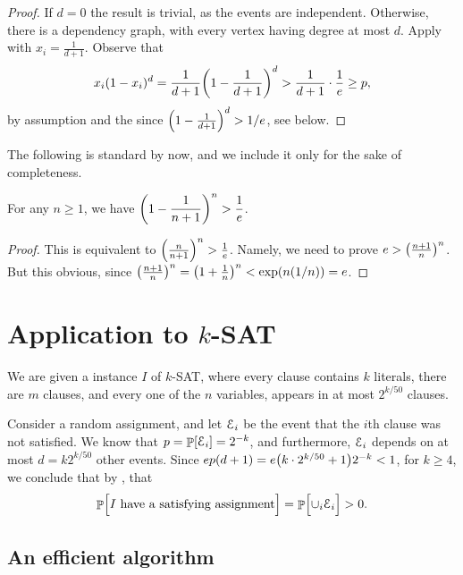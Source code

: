 \begin{proof}
    If $d = 0$ the result is trivial, as the events are
    independent. Otherwise, there is a dependency graph,
    with every vertex having degree at most $d$. Apply
     with $x_i = \frac{1}{d+1}$. Observe that
    \begin{align*}
    x_i (1-x_i)^{d} =\frac{1}{d+1}\pth{1- \frac{1}{d+1}}^d
    > \frac{1}{d+1} \cdot \frac{1}{e} \geq p,
    \end{align*}
    by assumption and the since $\pth[]{1- \frac{1}{d+1}}^d >
    1/e$, see 
     below.
\end{proof}


The following is standard by now, and we include it only for the sake
of completeness.
\begin{lemma}
    For any $n \geq 1$, we have $\ds \pth[]{1- \frac{1}{n+1}}^n >
    \frac{1}{e}$.
\end{lemma}
\begin{proof}
    This is equivalent to $\pth{\frac{n}{n+1}}^n >
    \frac{1}{e}$. Namely, we need to prove $e >
    \pth{\frac{n+1}{n}}^n$. But this obvious, since
    $\pth{\frac{n+1}{n}}^n = \pth{1 + \frac{1}{n}}^n < \exp
    \pth{n(1/n)} = e$.
\end{proof}

\section{Application to $k$-SAT}

We are given a instance $I$ of $k$-SAT, where every clause
contains $k$ literals, there are $m$ clauses, and every one
of the $n$ variables, appears in at most $2^{k/50}$
clauses. 

Consider a random assignment, and let $\EuScript{E}_i$ be the event that the
$i$th clause was not satisfied. We know that $p = \Prob{\Event_i} =
2^{-k}$, and furthermore, $\EuScript{E}_i$ depends on at most $d = k
2^{k/50}$ other events. Since $e p(d+1) = e \pth{k\cdot 2^{k/50} +
   1}2^{-k}<1$, for $k\geq 4$, we conclude that by ,
that
\begin{align*}
\Prob{ \Bigl. I \text{ have a satisfying assignment}}%
=%
\Prob{ \Bigl. \cup_{i} \Event_i} > 0.
\end{align*}

\subsection{An efficient algorithm}

